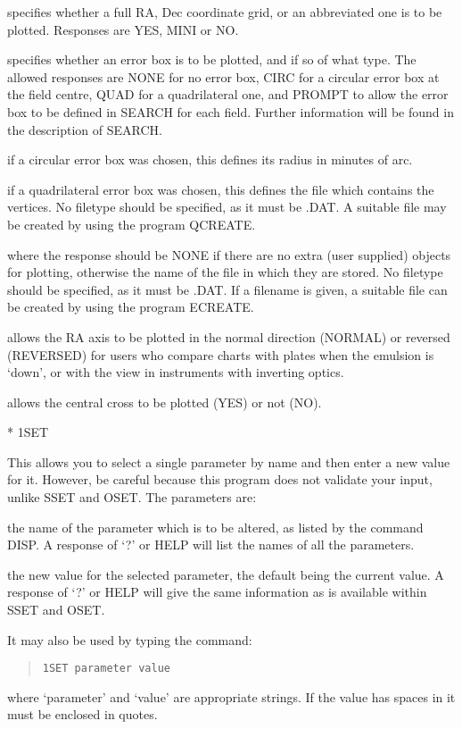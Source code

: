 \begin{list}{}{\setlength{\leftmargin}{20mm}
\setlength{\labelsep}{5mm}
\setlength{\labelwidth}{5mm}
}
\item[{\bf GRID}]
specifies whether a full RA, Dec coordinate grid, or an abbreviated one
is to be plotted.
Responses are YES, MINI or NO.

\item[{\bf ERRBOX}]
specifies whether an error box is to be plotted, and if so of what type.
The allowed responses are NONE for no error box, CIRC for a circular error box
at the field centre, QUAD for a quadrilateral one, and PROMPT to allow the error
box to be defined in SEARCH for each field.
Further information will be found in the description of SEARCH.

\item[{\bf RADIUS}]
if a circular error box was chosen, this defines its radius in minutes
of arc.

\item[{\bf COORDS}]
if a quadrilateral error box was chosen, this defines the file which
contains the vertices.
No filetype should be specified, as it must be .DAT.
A suitable file may be created by using the program QCREATE.

\item[{\bf EXTRA}]
where the response should be NONE if there are no extra (user supplied)
objects for plotting, otherwise the name of the file in which they are stored.
No filetype should be specified, as it must be .DAT.
If a filename is given, a suitable file can be created by using the program
ECREATE.

\item[{\bf DIRECT}]
allows the RA axis to be plotted in the normal direction (NORMAL) or
reversed (REVERSED) for users who compare charts with plates when the emulsion
is `down', or with the view in instruments with inverting optics.

\item[{\bf CROSS}]
allows the central cross to be plotted (YES) or not (NO).
\end{list}

* 1SET

This allows you to select a single parameter by name and then enter a new value
for it.
However, be careful because this program does not validate your input, unlike
SSET and OSET.
The parameters are:
\begin{list}{}{\setlength{\leftmargin}{20mm}
\setlength{\labelsep}{5mm}
\setlength{\labelwidth}{5mm}
}
\item[{\bf PARAMETER}]
the name of the parameter which is to be altered, as listed by
the command DISP.
A response of `?' or HELP will list the names of all the parameters.

\item[{\bf VALUE}]
the new value for the selected parameter, the default being the current value.
A response of `?' or HELP will give the same information as is available within
SSET and OSET.
\end{list}
It may also be used by typing the command:
\begin{quote}
{\tt 1SET parameter value}
\end{quote}
where `parameter' and `value' are appropriate strings.
If the value has spaces in it must be enclosed in quotes.
